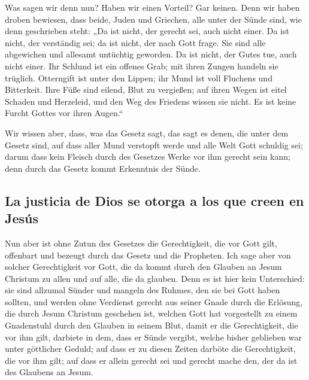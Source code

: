  Was sagen wir denn nun? Haben wir einen Vorteil? Gar
keinen. Denn wir haben droben bewiesen, dass beide, Juden und Griechen,
alle unter der Sünde sind,  wie denn geschrieben steht:
„Da ist nicht, der gerecht sei, auch nicht einer.  Da ist
nicht, der verständig sei; da ist nicht, der nach Gott frage.
 Sie sind alle abgewichen und allesamt untüchtig
geworden. Da ist nicht, der Gutes tue, auch nicht einer. 
Ihr Schlund ist ein offenes Grab; mit ihren Zungen handeln sie trüglich.
Otterngift ist unter den Lippen;  ihr Mund ist voll
Fluchens und Bitterkeit.  Ihre Füße sind eilend, Blut zu
vergießen;  auf ihren Wegen ist eitel Schaden und
Herzeleid,  und den Weg des Friedens wissen sie nicht.
 Es ist keine Furcht Gottes vor ihren Augen.``

 Wir wissen aber, dass, was das Gesetz sagt, das sagt es
denen, die unter dem Gesetz sind, auf dass aller Mund verstopft werde
und alle Welt Gott schuldig sei;  darum dass kein Fleisch
durch des Gesetzes Werke vor ihm gerecht sein kann; denn durch das
Gesetz kommt Erkenntnis der Sünde.

\hypertarget{la-justicia-de-dios-se-otorga-a-los-que-creen-en-jesuxfas}{%
\subsection{La justicia de Dios se otorga a los que creen en
Jesús}\label{la-justicia-de-dios-se-otorga-a-los-que-creen-en-jesuxfas}}

 Nun aber ist ohne Zutun des Gesetzes die Gerechtigkeit,
die vor Gott gilt, offenbart und bezeugt durch das Gesetz und die
Propheten.  Ich sage aber von solcher Gerechtigkeit vor
Gott, die da kommt durch den Glauben an Jesum Christum zu allen und auf
alle, die da glauben.  Denn es ist hier kein Unterschied:
sie sind allzumal Sünder und mangeln des Ruhmes, den sie bei Gott haben
sollten,  und werden ohne Verdienst gerecht aus seiner
Gnade durch die Erlösung, die durch Jesum Christum geschehen ist,
 welchen Gott hat vorgestellt zu einem Gnadenstuhl durch
den Glauben in seinem Blut, damit er die Gerechtigkeit, die vor ihm
gilt, darbiete in dem, dass er Sünde vergibt, welche bisher geblieben
war unter göttlicher Geduld;  auf dass er zu diesen
Zeiten darböte die Gerechtigkeit, die vor ihm gilt; auf dass er allein
gerecht sei und gerecht mache den, der da ist des Glaubens an Jesum.

